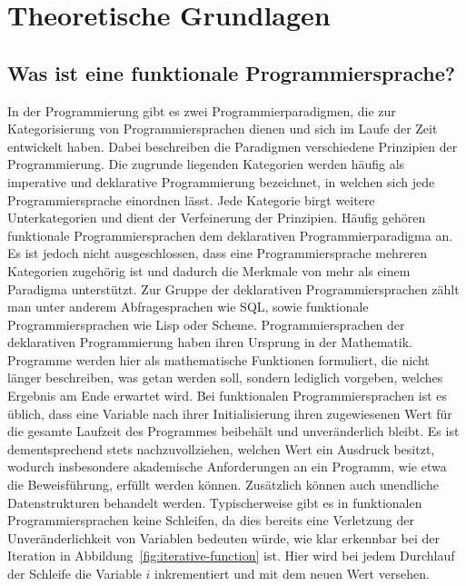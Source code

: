 \chapter{Theoretische Grundlagen}
\label{sec:grundlagen}
\pagestyle{plain}

\section{Was ist eine funktionale Programmiersprache?}
\label{sec:funktionaleProgrammiersprache}
In der Programmierung gibt es zwei Programmierparadigmen, die zur Kategorisierung von Programmiersprachen dienen und sich im Laufe der Zeit entwickelt haben. %
Dabei beschreiben die Paradigmen verschiedene Prinzipien der Programmierung.
Die zugrunde liegenden Kategorien werden häufig als imperative und deklarative Programmierung bezeichnet, in welchen sich jede Programmiersprache einordnen lässt. Jede Kategorie birgt weitere Unterkategorien und dient der Verfeinerung der Prinzipien.
Häufig gehören funktionale Programmiersprachen dem deklarativen Programmierparadigma an. Es ist jedoch nicht ausgeschlossen, dass eine Programmiersprache mehreren Kategorien zugehörig ist und dadurch die Merkmale von mehr als einem Paradigma unterstützt. Zur Gruppe der deklarativen Programmiersprachen zählt man unter anderem Abfragesprachen wie SQL, sowie funktionale Programmiersprachen wie Lisp oder Scheme.
Programmiersprachen der deklarativen Programmierung haben ihren Ursprung in der Mathematik. Programme werden hier als mathematische Funktionen formuliert, die nicht länger beschreiben, was getan werden soll, sondern lediglich vorgeben, welches Ergebnis am Ende erwartet wird.
Bei funktionalen Programmiersprachen ist es üblich, dass eine Variable nach ihrer Initialisierung ihren zugewiesenen Wert für die gesamte Laufzeit des Programmes beibehält und unveränderlich bleibt. Es ist dementsprechend stets nachzuvollziehen, welchen Wert ein Ausdruck besitzt, wodurch insbesondere akademische Anforderungen an ein Programm, wie etwa die Beweisführung, erfüllt werden können. Zusätzlich können auch unendliche Datenstrukturen behandelt werden.
Typischerweise gibt es in funktionalen Programmiersprachen keine Schleifen, da dies bereits eine Verletzung der Unveränderlichkeit von Variablen bedeuten würde, wie klar erkennbar bei der Iteration in Abbildung~\ref{fig:iterative-function} ist. Hier wird bei jedem Durchlauf der Schleife die Variable $i$ inkrementiert und mit dem neuen Wert versehen.
